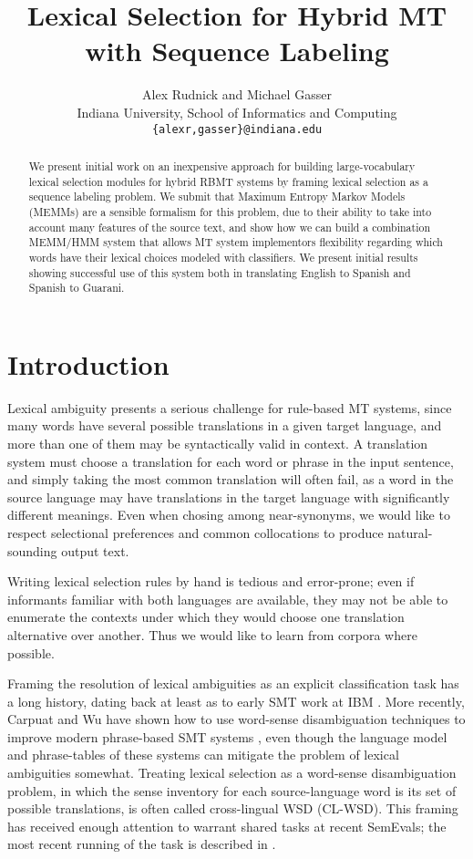 \documentclass[11pt]{article}
\title{Lexical Selection for Hybrid MT with Sequence Labeling}
\author{Alex Rudnick and Michael Gasser\\
        Indiana University, School of Informatics and Computing \\
        {\tt \{alexr,gasser\}@indiana.edu}}
\date{}
\begin{document}
\maketitle
\begin{abstract}
We present initial work on an inexpensive approach for building
large-vocabulary lexical selection modules for hybrid RBMT systems by framing
lexical selection as a sequence labeling problem. We submit that Maximum
Entropy Markov Models (MEMMs) are a sensible formalism for this problem, due to
their ability to take into account many features of the source text, and show
how we can build a combination MEMM/HMM system that allows MT system
implementors flexibility regarding which words have their lexical choices
modeled with classifiers. We present initial results showing successful use of
this system both in translating English to Spanish and Spanish to Guarani.
\end{abstract}

\section{Introduction}
Lexical ambiguity presents a serious challenge for rule-based MT systems, since
many words have several possible translations in a given target language, and
more than one of them may be syntactically valid in context. A translation
system must choose a translation for each word or phrase in the input sentence,
and simply taking the most common translation will often fail, as a word in the
source language may have translations in the target language with significantly
different meanings. Even when chosing among near-synonyms, we would like to
respect selectional preferences and common collocations to produce
natural-sounding output text.

Writing lexical selection rules by hand is tedious and error-prone; even if
informants familiar with both languages are available, they may not be able to
enumerate the contexts under which they would choose one translation
alternative over another. Thus we would like to learn from corpora where
possible. 

Framing the resolution of lexical ambiguities as an explicit classification
task has a long history, dating back at least as to early SMT work at IBM
\cite{Brown91word-sensedisambiguation}.  More recently, Carpuat and Wu have
shown how to use word-sense disambiguation techniques to improve modern
phrase-based SMT systems \cite{carpuatpsd}, even though the language model and
phrase-tables of these systems can mitigate the problem of lexical ambiguities
somewhat. Treating lexical selection as a word-sense disambiguation problem, in
which the sense inventory for each source-language word is its set of possible
translations, is often called cross-lingual WSD (CL-WSD). This framing has
received enough attention to warrant shared tasks at recent SemEvals; the most
recent running of the task is described in \cite{task10}.
\end{document}
